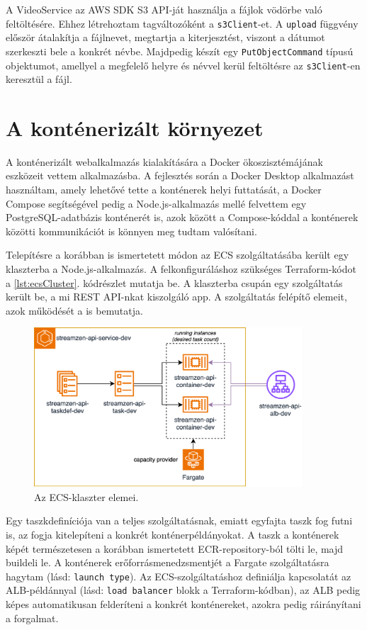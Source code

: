 A VideoService az AWS SDK S3 API-ját használja a fájlok vödörbe való feltöltésére. Ehhez létrehoztam tagváltozóként a \verb|s3Client|-et. A \verb|upload| függvény először átalakítja a fájlnevet, megtartja a kiterjesztést, viszont a dátumot szerkeszti bele a konkrét névbe. Majdpedig készít egy \verb|PutObjectCommand| típusú objektumot, amellyel a megfelelő helyre és névvel kerül feltöltésre az \verb|s3Client|-en keresztül a fájl.

\section{A konténerizált környezet}

A konténerizált webalkalmazás kialakítására a Docker ökoszisztémájának eszközeit vettem alkalmazásba. A fejlesztés során a Docker Desktop alkalmazást használtam, amely lehetővé tette a konténerek helyi futtatását, a Docker Compose segítségével pedig a Node.js-alkalmazás mellé felvettem egy PostgreSQL-adatbázis konténerét is, azok között a Compose-kóddal a konténerek közötti kommunikációt is könnyen meg tudtam valósítani.

Telepítésre a korábban is ismertetett módon az ECS szolgáltatásába került egy klaszterba a Node.js-alkalmazás. A felkonfiguráláshoz szükséges Terraform-kódot a \ref{lst:ecsCluster}. kódrészlet mutatja be. A klaszterba csupán egy szolgáltatás került be, a mi REST API-nkat kiszolgáló app. A szolgáltatás felépítő elemeit, azok működését a  is bemutatja.

\begin{figure}[ht!]
  \centering
  \includegraphics[width=100mm, keepaspectratio]{figures/dipterv_ecs.png}
  \caption{Az ECS-klaszter elemei.}
  \label{fig:ecscluster}
\end{figure}

Egy taszkdefiníciója van a teljes szolgáltatásnak, emiatt egyfajta taszk fog futni is, az fogja kitelepíteni a konkrét konténerpéldányokat. A taszk a konténerek képét természetesen a korábban ismertetett ECR-repository-ból tölti le, majd buildeli le. A konténerek erőforrásmenedzsmentjét a Fargate szolgáltatásra hagytam (lásd: \verb|launch type|). Az ECS-szolgáltatáshoz definiálja kapcsolatát az ALB-példánnyal (lásd: \verb|load balancer| blokk a Terraform-kódban), az ALB pedig képes automatikusan felderíteni a konkrét konténereket, azokra pedig ráirányítani a forgalmat.

